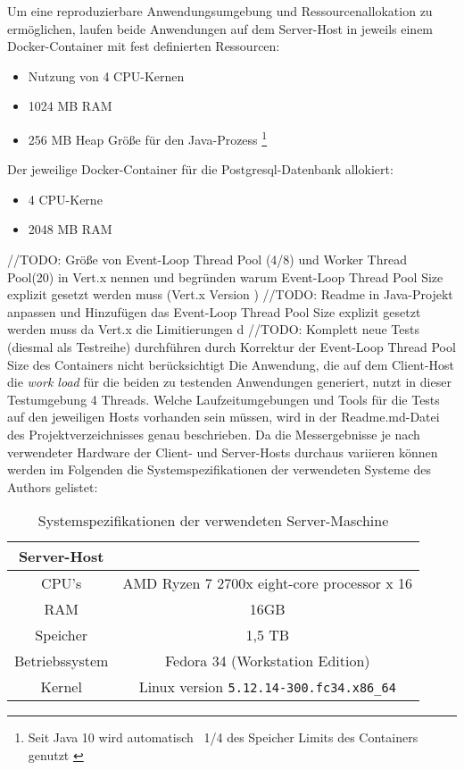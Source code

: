 Um eine reproduzierbare Anwendungsumgebung und Ressourcenallokation zu ermöglichen, laufen beide Anwendungen auf dem Server-Host in
jeweils einem Docker-Container mit fest definierten Ressourcen:
\begin{itemize}
	\item Nutzung von 4 CPU-Kernen
	\item 1024 MB RAM
	\item 256 MB Heap Größe für den Java-Prozess
	      \footnote{Seit Java 10 wird automatisch ~1/4 des Speicher Limits des Containers genutzt \parencite{Java10ReleaseNotes}}
\end{itemize}
Der jeweilige Docker-Container für die Postgresql-Datenbank allokiert:
\begin{itemize}
	\item 4 CPU-Kerne
	\item 2048 MB RAM
\end{itemize}
//TODO: Größe von Event-Loop Thread Pool (4/8) und Worker Thread Pool(20) in Vert.x nennen und begründen warum Event-Loop Thread Pool Size explizit
gesetzt werden muss (Vert.x Version )
//TODO: Readme in Java-Projekt anpassen und Hinzufügen das Event-Loop Thread Pool Size explizit gesetzt werden muss da Vert.x die Limitierungen d
//TODO: Komplett neue Tests (diesmal als Testreihe) durchführen durch Korrektur der Event-Loop Thread Pool Size
des Containers nicht berücksichtigt
Die Anwendung, die auf dem Client-Host die \textit{work load} für die beiden zu testenden Anwendungen generiert,
nutzt in dieser Testumgebung 4 Threads.
Welche Laufzeitumgebungen und Tools für die Tests auf den jeweiligen Hosts vorhanden sein müssen,
wird in der Readme.md-Datei des Projektverzeichnisses genau beschrieben.
Da die Messergebnisse je nach verwendeter Hardware der Client- und Server-Hosts durchaus variieren können werden im Folgenden
die Systemspezifikationen der verwendeten Systeme des Authors gelistet:
\begin{table}[ht!]
	\centering
	\begin{tabular}{| c | c |}
		\hline
		Server-Host                                                  \\
		\hline
		CPU's          & AMD Ryzen 7 2700x eight-core processor x 16 \\
		\hline
		RAM            & 16GB                                        \\
		\hline
		Speicher       & 1,5 TB                                      \\
		\hline
		Betriebssystem & Fedora 34 (Workstation Edition)             \\
		\hline
		Kernel         & Linux version \verb|5.12.14-300.fc34.x86_64|    \\
		\hline
	\end{tabular}
	\caption{Systemspezifikationen der verwendeten Server-Maschine}
	\label{table:system_host}
\end{table}

